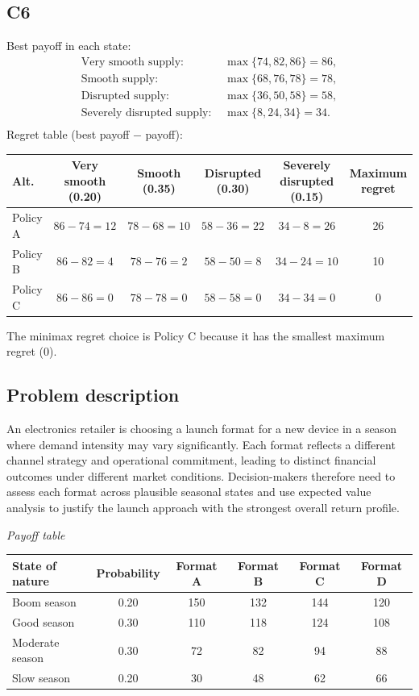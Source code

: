 \begin{ExamProblems}
		\subsection*{C6}
		Best payoff in each state:
		\[
		\begin{aligned}
			\text{Very smooth supply: } &\max\{74, 82, 86\} = 86, \\
			\text{Smooth supply: } &\max\{68, 76, 78\} = 78, \\
			\text{Disrupted supply: } &\max\{36, 50, 58\} = 58, \\
			\text{Severely disrupted supply: } &\max\{8, 24, 34\} = 34. \\
		\end{aligned}
		\]
		Regret table (best payoff $-$ payoff):
		\begin{center}
			\begin{tabular}{l c c c c c}
				\toprule
				Alt. & Very smooth (0.20) & Smooth (0.35) & Disrupted (0.30) & Severely disrupted (0.15) & Maximum regret \\
				\midrule
				Policy A & $86-74=12$ & $78-68=10$ & $58-36=22$ & $34-8=26$ & 26 \\
				Policy B & $86-82=4$ & $78-76=2$ & $58-50=8$ & $34-24=10$ & 10 \\
				Policy C & $86-86=0$ & $78-78=0$ & $58-58=0$ & $34-34=0$ & 0 \\
				\bottomrule
			\end{tabular}
		\end{center}
		The minimax regret choice is Policy C because it has the smallest maximum regret (0).
		\item
		\subsection*{Problem description}
		An electronics retailer is choosing a launch format for a new device in a season where demand intensity may vary significantly. Each format reflects a different channel strategy and operational commitment, leading to distinct financial outcomes under different market conditions. Decision-makers therefore need to assess each format across plausible seasonal states and use expected value analysis to justify the launch approach with the strongest overall return profile.

		\begin{center}
			\textit{Payoff table} \par
			\begin{tabular}{l c c c c c}
				\toprule
				State of nature & Probability & Format A & Format B & Format C & Format D \\
				\midrule
				Boom season & 0.20 & 150 & 132 & 144 & 120 \\
				Good season & 0.30 & 110 & 118 & 124 & 108 \\
				Moderate season & 0.30 & 72 & 82 & 94 & 88 \\
				Slow season & 0.20 & 30 & 48 & 62 & 66 \\
				\bottomrule
			\end{tabular}
		\end{center}


\end{ExamProblems}
